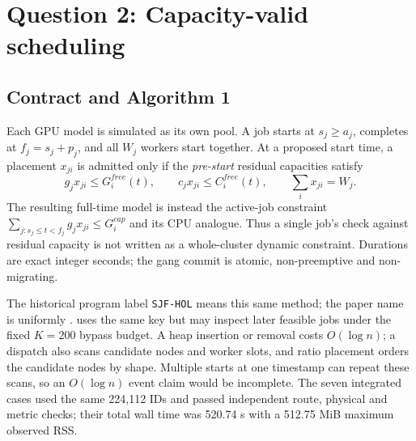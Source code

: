 \section{Question 2: Capacity-valid scheduling}
\label{sec:r1q2}
\subsection{Contract and Algorithm 1}
Each GPU model is simulated as its own pool. A job starts at $s_j\ge a_j$, completes at $f_j=s_j+p_j$, and all $W_j$ workers start together. At a proposed start time, a placement $x_{ji}$ is admitted only if the \emph{pre-start} residual capacities satisfy
\begin{equation}
 g_jx_{ji}\le G_i^{free}(t),\qquad c_jx_{ji}\le C_i^{free}(t),\qquad \sum_i x_{ji}=W_j.
\end{equation}
The resulting full-time model is instead the active-job constraint $\sum_{j:s_j\le t<f_j}g_jx_{ji}\le G_i^{cap}$ and its CPU analogue. Thus a single job's check against residual capacity is not written as a whole-cluster dynamic constraint. Durations are exact integer seconds; the gang commit is atomic, non-preemptive and non-migrating.


The historical program label \texttt{SJF-HOL} means this same method; the paper name is uniformly .  uses the same key but may inspect later feasible jobs under the fixed $K=200$ bypass budget. A heap insertion or removal costs $O(\log n)$; a dispatch also scans candidate nodes and worker slots, and ratio placement orders the candidate nodes by shape. Multiple starts at one timestamp can repeat these scans, so an $O(\log n)$ event claim would be incomplete. The seven integrated cases used the same 224,112 IDs and passed independent route, physical and metric checks; their total wall time was 520.74 s with a 512.75 MiB maximum observed RSS.

